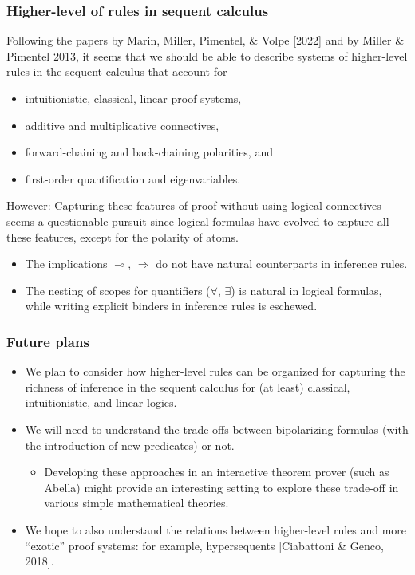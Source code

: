 \documentclass[9pt]{beamer}
\begin{document}
\begin{frame}
\frametitle{Higher-level of rules in sequent calculus}

Following the papers by Marin, Miller, Pimentel, \& Volpe [2022] and
by Miller \& Pimentel 2013, it seems that we should be able to
describe systems of higher-level rules in the sequent calculus that
account for
\begin{itemize}
\item intuitionistic, classical, linear proof systems,
\item additive and multiplicative connectives,
\item forward-chaining and back-chaining polarities, and 
\item first-order quantification and eigenvariables.
\end{itemize}
\vfill
\pause

However: Capturing these features of proof without using logical connectives
seems a questionable pursuit since logical formulas have evolved to
capture all these features, except for the polarity of atoms.
\vfill

\begin{itemize}
\item The implications $\multimap$, $\Rightarrow$ do not 
  have natural counterparts in inference rules.
  
\item The nesting of scopes for quantifiers ($\forall$, $\exists$) is
  natural in logical formulas, while writing explicit binders in
  inference rules is eschewed.
\end{itemize}
\vfill

\end{frame}

\begin{frame}
\frametitle{Future plans}

\begin{itemize}

\item We plan to consider how higher-level rules can be organized for
  capturing the richness of inference in the sequent calculus for (at
  least) classical, intuitionistic, and linear logics.

\vfill

\item We will need to understand the trade-offs between bipolarizing
  formulas (with the introduction of new predicates) or not.
  \medskip
  
\begin{itemize}
  \item Developing these approaches in an interactive theorem
    prover (such as Abella) might provide an interesting setting to
    explore these trade-off in various simple mathematical theories.
\end{itemize}
\vfill

\item We hope to also understand the relations between higher-level
  rules and more ``exotic'' proof systems: for example, hypersequents
  [Ciabattoni \& Genco, 2018]. 
\vfill
\vfill
\end{itemize}
\end{frame}
\end{document}
